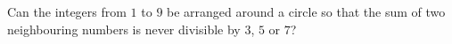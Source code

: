 Can the integers from $1$ to $9$ be arranged around a circle so that the sum of two neighbouring numbers is never divisible by $3$, $5$ or $7$?
